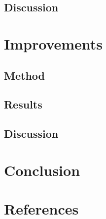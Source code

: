 \documentclass{article}
\begin{document}
\subsection{Discussion}



\section{Improvements}

\subsection{Method}

\subsection{Results}

\subsection{Discussion}



\section{Conclusion}



\section{References}
\end{document}
